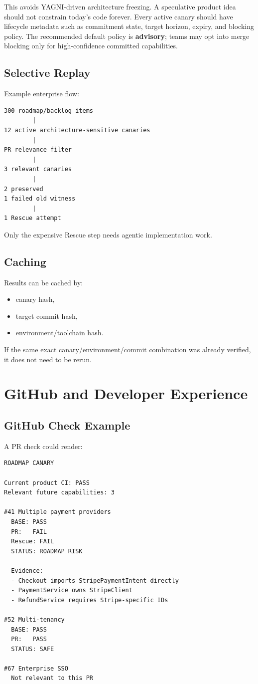 \documentclass[12pt]{article}
\begin{document}
This avoids YAGNI-driven architecture freezing. A speculative product idea should not constrain today's code forever. Every active canary should have lifecycle metadata such as commitment state, target horizon, expiry, and blocking policy. The recommended default policy is \textbf{advisory}; teams may opt into merge blocking only for high-confidence committed capabilities.

\subsection{Selective Replay}

Example enterprise flow:

\begin{lstlisting}
300 roadmap/backlog items
        |
12 active architecture-sensitive canaries
        |
PR relevance filter
        |
3 relevant canaries
        |
2 preserved
1 failed old witness
        |
1 Rescue attempt
\end{lstlisting}

Only the expensive Rescue step needs agentic implementation work.

\subsection{Caching}

Results can be cached by:

\begin{itemize}
    \item canary hash,
    \item target commit hash,
    \item environment/toolchain hash.
\end{itemize}

If the same exact canary/environment/commit combination was already verified, it does not need to be rerun.

\section{GitHub and Developer Experience}

\subsection{GitHub Check Example}

A PR check could render:

\begin{lstlisting}
ROADMAP CANARY

Current product CI: PASS
Relevant future capabilities: 3

#41 Multiple payment providers
  BASE: PASS
  PR:   FAIL
  Rescue: FAIL
  STATUS: ROADMAP RISK

  Evidence:
  - Checkout imports StripePaymentIntent directly
  - PaymentService owns StripeClient
  - RefundService requires Stripe-specific IDs

#52 Multi-tenancy
  BASE: PASS
  PR:   PASS
  STATUS: SAFE

#67 Enterprise SSO
  Not relevant to this PR
\end{lstlisting}
\end{document}
